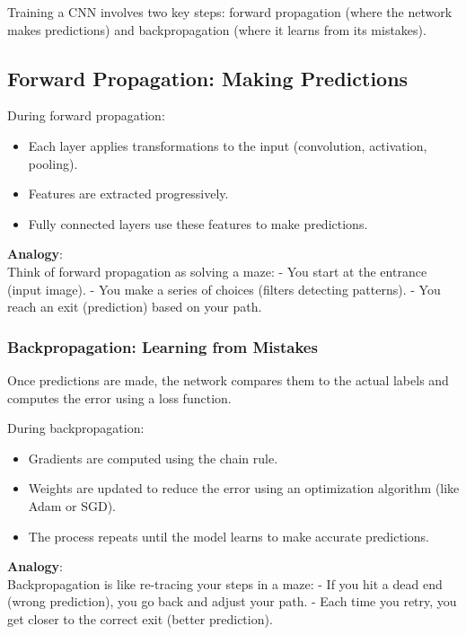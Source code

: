 \documentclass[
  letterpaper,
  DIV=11,
  numbers=noendperiod]{scrreprt}
\providecommand{\tightlist}{%
  \setlength{\itemsep}{0pt}\setlength{\parskip}{0pt}}\usepackage{longtable,booktabs,array}
\begin{document}
Training a CNN involves two key steps: forward propagation (where the
network makes predictions) and backpropagation (where it learns from its
mistakes).

\subsection{Forward Propagation: Making
Predictions}\label{forward-propagation-making-predictions}

During forward propagation:

\begin{itemize}
\tightlist
\item
  Each layer applies transformations to the input (convolution,
  activation, pooling).
\item
  Features are extracted progressively.
\item
  Fully connected layers use these features to make predictions.
\end{itemize}

\textbf{Analogy}:\\
Think of forward propagation as solving a maze: - You start at the
entrance (input image). - You make a series of choices (filters
detecting patterns). - You reach an exit (prediction) based on your
path.

\subsubsection{Backpropagation: Learning from
Mistakes}\label{backpropagation-learning-from-mistakes}

Once predictions are made, the network compares them to the actual
labels and computes the error using a loss function.

During backpropagation:

\begin{itemize}
\tightlist
\item
  Gradients are computed using the chain rule.
\item
  Weights are updated to reduce the error using an optimization
  algorithm (like Adam or SGD).
\item
  The process repeats until the model learns to make accurate
  predictions.
\end{itemize}

\textbf{Analogy}:\\
Backpropagation is like re-tracing your steps in a maze: - If you hit a
dead end (wrong prediction), you go back and adjust your path. - Each
time you retry, you get closer to the correct exit (better prediction).
\end{document}
